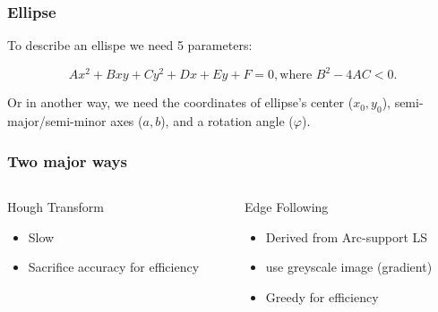 \documentclass{beamer}
\begin{document}
    \begin{frame}
        \frametitle{Ellipse}

        To describe an ellispe we need 5 parameters:

        $$ Ax^2 + Bxy + Cy^2 + Dx + Ey + F = 0 , \text{where } B^2 - 4 AC < 0.$$

        Or in another way, we need the coordinates of ellipse's center ($x_0, y_0$), semi-major/semi-minor axes ($a,b$),
        and a rotation angle ($\varphi$).
        \begin{center}
        \end{center}
        

    \end{frame}

    \begin{frame}
        \frametitle{Two major ways}
        
        

        \begin{columns}
            \begin{column}{.5\linewidth}
                Hough Transform
                \begin{itemize}
                    \item Slow
                    \item Sacrifice accuracy for efficiency
                \end{itemize}
            \end{column}
            \begin{column}{.5\linewidth}
                Edge Following
                \begin{itemize}
                    \item Derived from Arc-support LS 
                    \item use greyscale image (gradient)
                    \item Greedy for efficiency
                \end{itemize}
            \end{column}
        \end{columns}
        
    \end{frame}
\end{document}
